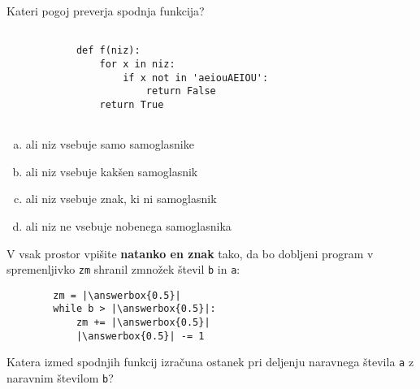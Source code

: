 \documentclass[arhiv, 10pt]{../izpit}
\newcommand{\inlinepy}[1]{\texttt{#1}}
\newcommand{\answerbox}[1]{\framebox{\vphantom{\large M}\hspace{#1cm}}}
\begin{document}
        \naloga*

        \begin{multicols}{2}
        \noindent
        Kateri pogoj preverja spodnja funkcija?
        \begin{verbatim}
        
            def f(niz):
                for x in niz:
                    if x not in 'aeiouAEIOU':
                        return False
                return True
            
        \end{verbatim}

        \begin{enumerate}[(a)]
\item ali niz vsebuje samo samoglasnike
\item ali niz vsebuje kakšen samoglasnik
\item ali niz vsebuje znak, ki ni samoglasnik
\item ali niz ne vsebuje nobenega samoglasnika
\end{enumerate}

        \end{multicols}
    
        \naloga*
        \begin{multicols}{2}
        \noindent
        V vsak prostor vpišite \textbf{natanko en znak} tako, da bo dobljeni program v spremenljivko \inlinepy{zm} shranil zmnožek števil \inlinepy{b} in \inlinepy{a}:
        
        \columnbreak
        \begin{verbatim}
        zm = |\answerbox{0.5}|
        while b > |\answerbox{0.5}|:
            zm += |\answerbox{0.5}|
            |\answerbox{0.5}| -= 1
        \end{verbatim}
        \end{multicols}
    
        \clearpage
        \naloga
        
        Katera izmed spodnjih funkcij izračuna ostanek pri deljenju naravnega števila \inlinepy{a} z naravnim številom \inlinepy{b}?
    
\end{document}
